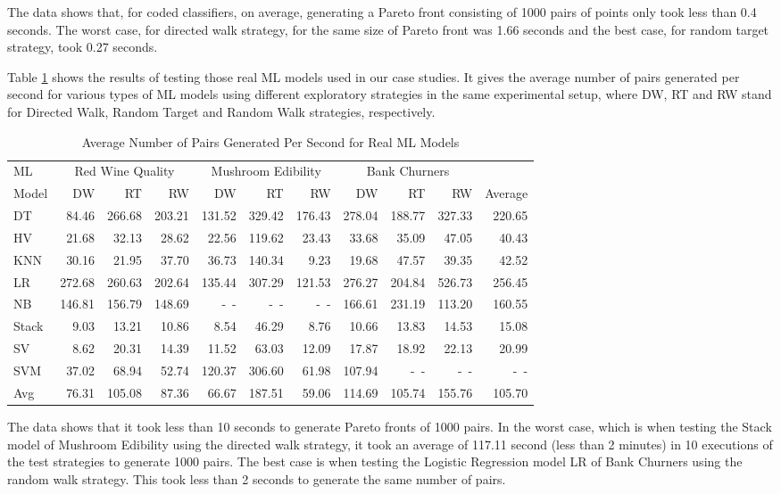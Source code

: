 \documentclass[preprint,1p,authoryear,times]{elsarticle}
\begin{document}
The data shows that, for coded classifiers, on average, generating a Pareto front consisting of 1000 pairs of points only took less than 0.4 seconds. The worst case, for directed walk strategy, for the same size of Pareto front was 1.66 seconds and the best case, for random target strategy, took 0.27 seconds. 

Table \ref{tab:TimeOfMLModels} shows the results of testing those real ML models used in our case studies. It gives the average number of pairs generated per second for various types of ML models using different exploratory strategies in the same experimental setup, where DW, RT and RW stand for Directed Walk, Random Target and Random Walk strategies, respectively. 

\begin{table}[h]
\centering
\caption{Average Number of Pairs Generated Per Second for Real ML Models}\label{tab:TimeOfMLModels}
\scriptsize
\begin{tabular}{|l|r|r|r|r|r|r|r|r|r|r|}
\hline
ML 	 &\multicolumn{3}{c|}{Red Wine Quality}	&\multicolumn{3}{c|}{Mushroom Edibility}	&\multicolumn{3}{c|}{Bank Churners}	&\\
Model &DW	&RT	&RW &DW	&RT	&RW &DW	&RT	&RW	&Average\\
\hline
DT	&84.46	&266.68	&203.21	&131.52	&329.42	&176.43	&278.04	&188.77	&327.33	&220.65\\
HV	&21.68	&32.13	&28.62	&22.56	&119.62	&23.43	&33.68	&35.09	&47.05	&40.43\\
KNN	&30.16	&21.95	&37.70	&36.73	&140.34	&9.23	&19.68	&47.57	&39.35	&42.52\\
LR	&272.68	&260.63	&202.64	&135.44	&307.29	&121.53	&276.27	&204.84	&526.73	&256.45\\
NB	&146.81	&156.79	&148.69	& -~-   	& -~-   	& -~-   	&166.61	&231.19	&113.20	&160.55\\
Stack	&9.03	&13.21	&10.86	&8.54	&46.29	&8.76	&10.66	&13.83	&14.53	&15.08\\
SV	&8.62	&20.31	&14.39	&11.52	&63.03	&12.09	&17.87	&18.92	&22.13	&20.99\\
SVM	&37.02	&68.94	&52.74	&120.37	&306.60	&61.98 	&107.94 &  -~- & 	-~-  & -~-\\
\hline
Avg	&76.31	&105.08	&87.36	&66.67	&187.51	&59.06	&114.69	&105.74	&155.76	&105.70\\
\hline
\end{tabular} 
\end{table}

The data shows that it took less than 10 seconds to generate Pareto fronts of 1000 pairs. In the worst case, which is when testing the Stack model of Mushroom Edibility using the directed walk strategy, it took an average of 117.11 second (less than 2 minutes) in 10 executions of the test strategies to generate 1000 pairs. The best case is when testing the Logistic Regression model LR of Bank Churners using the random walk strategy. This took less than 2 seconds to generate the same number of pairs. 
\end{document}
